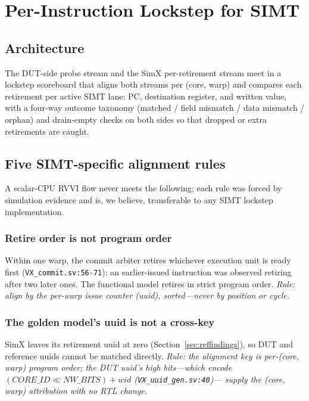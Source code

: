 \documentclass[conference]{IEEEtran}
\newcommand{\code}[1]{\texttt{\small #1}}
\begin{document}
\section{Per-Instruction Lockstep for SIMT}
\label{sec:lockstep}

\subsection{Architecture}
The DUT-side probe stream and the SimX per-retirement stream meet in a
lockstep scoreboard that aligns both streams per (core, warp) and
compares each retirement per active SIMT lane: PC, destination
register, and written value, with a four-way outcome taxonomy
(matched / field mismatch / data mismatch / orphan) and drain-empty
checks on both sides so that dropped or extra retirements are caught.

\subsection{Five SIMT-specific alignment rules}
\label{sec:rules}
A scalar-CPU RVVI flow never meets the following; each rule was forced
by simulation evidence and is, we believe, transferable to any SIMT
lockstep implementation.

\subsubsection{Retire order is not program order}
Within one warp, the commit arbiter retires whichever execution unit is
ready first (\code{VX\_commit.sv:56-71}); an earlier-issued instruction
was observed retiring after two later ones. The functional model
retires in strict program order. \emph{Rule: align by the per-warp
issue counter (uuid), sorted---never by position or cycle.}

\subsubsection{The golden model's uuid is not a cross-key}
SimX leaves its retirement uuid at zero (Section~\ref{sec:reffindings}),
so DUT and reference uuids cannot be matched directly. \emph{Rule: the
alignment key is per-(core, warp) program order; the DUT uuid's
high bits---which encode $(\textit{CORE\_ID} \ll
\textit{NW\_BITS}) + \textit{wid}$ (\code{VX\_uuid\_gen.sv:40})---%
supply the (core, warp) attribution with no RTL change.}
\end{document}
